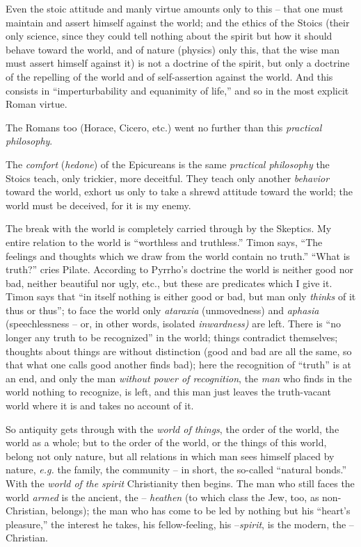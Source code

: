 Even the stoic attitude and manly virtue amounts only to this -- that one must 
maintain and assert himself against the world; and the ethics of the Stoics 
(their only science, since they could tell nothing about the spirit but how it 
should behave toward the world, and of nature (physics) only this, that the 
wise man must assert himself against it) is not a doctrine of the spirit, but 
only a doctrine of the repelling of the world and of self-assertion against 
the world. And this consists in ``imperturbability and equanimity of life,'' 
and so in the most explicit Roman virtue.

The Romans too (Horace, Cicero, etc.) went no further than this 
\textit{practical philosophy}.

The \textit{comfort} (\textit{hedone}) of the Epicureans is the same 
\textit{practical philosophy} the Stoics teach, only trickier, more deceitful. 
They teach only another \textit{behavior} toward the world, exhort us only to 
take a shrewd attitude toward the world; the world must be deceived, for it is 
my enemy.

The break with the world is completely carried through by the Skeptics. My 
entire relation to the world is ``worthless and truthless.'' Timon says, 
``The feelings and thoughts which we draw from the world contain no truth.'' 
``What is truth?'' cries Pilate. According to Pyrrho's doctrine the world is 
neither good nor bad, neither beautiful nor ugly, etc., but these are 
predicates which I give it. Timon says that ``in itself nothing is either 
good or bad, but man only \textit{thinks} of it thus or thus''; to face the 
world only \textit{ataraxia} (unmovedness) and \textit{aphasia} 
(speechlessness -- or, in other words, isolated \textit{inwardness)} are left. 
There is ``no longer any truth to be recognized'' in the world; things 
contradict themselves; thoughts about things are without distinction (good and 
bad are all the same, so that what one calls good another finds bad); here the 
recognition of ``truth'' is at an end, and only the man \textit{without 
power of recognition}, the \textit{man} who finds in the world nothing to 
recognize, is left, and this man just leaves the truth-vacant world where it 
is and takes no account of it.

So antiquity gets through with the \textit{world of things}, the order of the 
world, the world as a whole; but to the order of the world, or the things of 
this world, belong not only nature, but all relations in which man sees 
himself placed by nature, \textit{e.g.} the family, the community -- in 
short, the so-called ``natural bonds.'' With the \textit{world of the 
spirit} Christianity then begins. The man who still faces the world 
\textit{armed} is the ancient, the -- \textit{heathen} (to which class the 
Jew, too, as non-Christian, belongs); the man who has come to be led by 
nothing but his ``heart's pleasure,'' the interest he takes, his 
fellow-feeling, his --\textit{spirit}, is the modern, the -- Christian.

